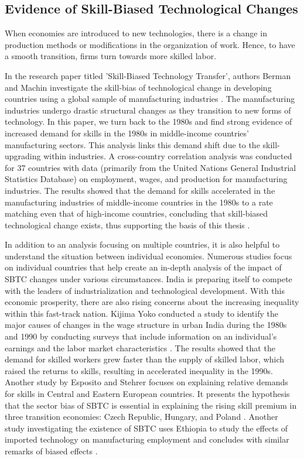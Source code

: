\documentclass[12pt,oneside]{book} %
\begin{document}
\subsection{Evidence of Skill-Biased Technological Changes}

\hspace{20pt}When economies are introduced to new technologies, there is a change in production methods or modifications in the organization of work. Hence, to have a smooth transition, firms turn towards more skilled labor.

\hspace{20pt}In the research paper titled 'Skill-Biased Technology Transfer', authors Berman and Machin investigate the skill-bias of technological change in developing countries using a global sample of manufacturing industries \cite{berman2000skill}. The manufacturing industries undergo drastic structural changes as they transition to new forms of technology. In this paper, we turn back to the 1980s and find strong evidence of increased demand for skills in the 1980s in middle-income countries' manufacturing sectors. This analysis links this demand shift due to the skill-upgrading within industries. A cross-country correlation analysis was conducted for 37 countries with data (primarily from the United Nations General Industrial Statistics Database) on employment, wages, and production for manufacturing industries. The results showed that the demand for skills accelerated in the manufacturing industries of middle-income countries in the 1980s to a rate matching even that of high-income countries, concluding that skill-biased technological change exists, thus supporting the basis of this thesis \cite{berman2000skill}.

In addition to an analysis focusing on multiple countries, it is also helpful to understand the situation between individual economies. Numerous studies focus on individual countries that help create an in-depth analysis of the impact of SBTC changes under various circumstances. India is preparing itself to compete with the leaders of industrialization and technological development. With this economic prosperity, there are also rising concerns about the increasing inequality within this fast-track nation. Kijima Yoko conducted a study to identify the major causes of changes in the wage structure in urban India during the 1980s and 1990 by conducting surveys that include information on an individual's earnings and the labor market characteristics \cite{kijima2006did}. The results showed that the demand for skilled workers grew faster than the supply of skilled labor, which raised the returns to skills, resulting in accelerated inequality in the 1990s. Another study by Esposito and Stehrer focuses on explaining relative demands for skills in Central and Eastern European countries. It presents the hypothesis that the sector bias of SBTC is essential in explaining the rising skill premium in three transition economies: Czech Republic, Hungary, and Poland \cite{esposito2009sector}. Another study investigating the existence of SBTC uses Ethiopia to study the effects of imported technology on manufacturing employment and concludes with similar remarks of biased effects \cite{haile2017imported}.
\end{document}
